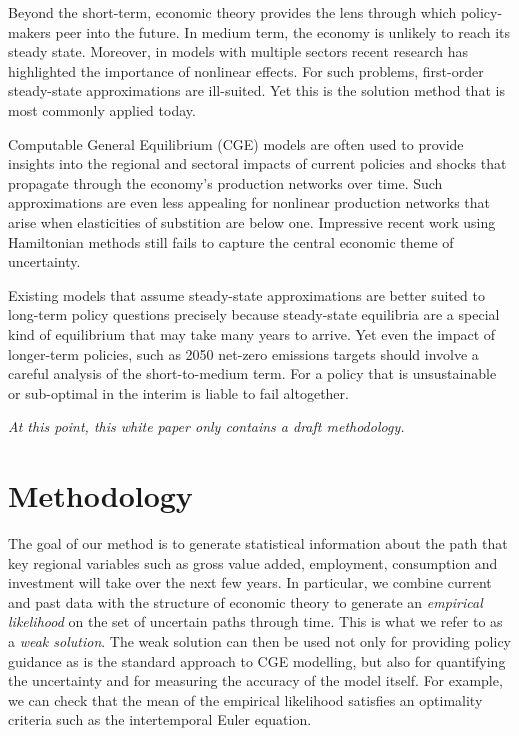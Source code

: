 \documentclass[12pt,a4paper,twoside, draft]{article}
\begin{document}
  Beyond the short-term, economic theory provides the lens through which
  policy-makers peer into the future. 
  In medium term, the economy is unlikely to reach its steady state. 
  Moreover, in models with multiple sectors recent research has highlighted
  the importance of nonlinear effects.
  For such problems, first-order steady-state approximations are ill-suited.
  Yet this is the solution method that is most commonly applied today.


  Computable General Equilibrium (CGE)
  models are often used to provide insights into the regional and sectoral
  impacts of current policies and shocks that propagate through the economy's
  production networks over time.
  Such approximations are even less appealing for nonlinear production networks
  that arise when elasticities of substition are below one.
  Impressive recent work using Hamiltonian methods still fails to capture
  the central economic theme of uncertainty.
  
  Existing models that assume steady-state approximations are better suited to
  long-term policy questions precisely because steady-state equilibria are a
  special kind of equilibrium that may take many years to arrive.
  Yet even the impact of longer-term policies, such as 2050 net-zero emissions
  targets should involve a careful analysis of the short-to-medium term.
  For a policy that is unsustainable or sub-optimal in the interim is liable to
  fail altogether.

\emph{At this point, this white paper only contains a draft methodology.}

\section{Methodology}\label{sec-methodology}
The goal of our method is to generate statistical information about the path
that key regional variables such as gross value added, employment, consumption
and investment will take over the next few years.
In particular, we combine current and past data with the structure of economic
theory to generate an \emph{empirical likelihood}
\citet{Owen-Empirical_likelihood} on the set of uncertain
paths through time. This is what we refer to as a \emph{weak solution}.
The weak solution can then be used not only for providing policy guidance as is
the standard approach to CGE modelling, but also for quantifying the
uncertainty and for measuring the accuracy of the model itself.
For example, we can check that the mean of the empirical likelihood
satisfies an optimality criteria such as the intertemporal Euler equation. 
\end{document}
